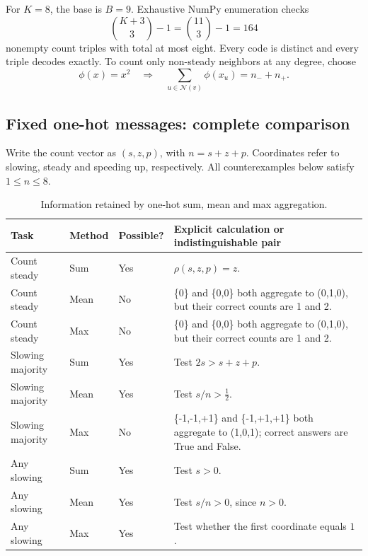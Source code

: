 \documentclass[11pt,a4paper]{article}
\begin{document}
For \(K=8\), the base is \(B=9\). Exhaustive NumPy enumeration checks
\begin{equation}\binom{K+3}{3}-1=\binom{11}{3}-1=164\end{equation}
nonempty count triples with total at most eight. Every code is distinct and every triple decodes exactly. To count only non-steady neighbors at any degree, choose
\begin{equation}\phi(x)=x^2\quad\Longrightarrow\quad\sum_{u\in\mathcal N(v)}\phi(x_u)=n_-+n_+.\end{equation}


\subsection{Fixed one-hot messages: complete comparison}

Write the count vector as \((s,z,p)\), with \(n=s+z+p\). Coordinates refer to slowing, steady and speeding up, respectively. All counterexamples below satisfy \(1\le n\le8\).


\begin{table}[H]
\centering\small
\caption{Information retained by one-hot sum, mean and max aggregation.}
\renewcommand{\arraystretch}{1.16}
\begin{tabularx}{\linewidth}{@{}>{\raggedright\arraybackslash}p{.16\linewidth}>{\raggedright\arraybackslash}p{.10\linewidth}>{\raggedright\arraybackslash}p{.11\linewidth}>{\raggedright\arraybackslash}X@{}}
\toprule
\textbf{Task} & \textbf{Method} & \textbf{Possible?} & \textbf{Explicit calculation or indistinguishable pair} \\
\midrule
Count steady & Sum & Yes & \(\rho(s,z,p)=z\). \\
Count steady & Mean & No & \{0\} and \{0,0\} both aggregate to (0,1,0), but their correct counts are 1 and 2. \\
Count steady & Max & No & \{0\} and \{0,0\} both aggregate to (0,1,0), but their correct counts are 1 and 2. \\
Slowing majority & Sum & Yes & Test \(2s>s+z+p\). \\
Slowing majority & Mean & Yes & Test \(s/n>\tfrac12\). \\
Slowing majority & Max & No & \{-1,-1,+1\} and \{-1,+1,+1\} both aggregate to (1,0,1); correct answers are True and False. \\
Any slowing & Sum & Yes & Test \(s>0\). \\
Any slowing & Mean & Yes & Test \(s/n>0\), since \(n>0\). \\
Any slowing & Max & Yes & Test whether the first coordinate equals \(1\). \\
\bottomrule
\end{tabularx}
\end{table}
\end{document}
